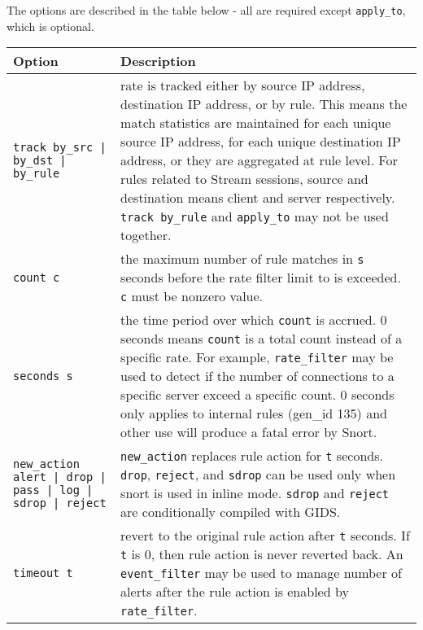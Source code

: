 \documentclass[english]{report}
\begin{document}
The options are described in the table below - all are required except
\texttt{apply\_to}, which is optional.

\begin{table}[h]
\begin{center}
\begin{tabular}{| p{2in} | p{4in} |}

\hline
\textbf{Option} & \textbf{Description}\\
\hline

\hline
\texttt{track by\_src | by\_dst | by\_rule} &

rate is tracked either by source IP address, destination IP address, or by
rule.  This means the match statistics are maintained for each unique source IP
address, for each unique destination IP address, or they are aggregated at rule
level.  For rules related to Stream sessions, source and destination means
client and server respectively.  \texttt{track by\_rule} and \texttt{apply\_to}
may not be used together.\\

\hline
\texttt{count c} &

the maximum number of rule matches in \texttt{s} seconds before the rate filter
limit to is exceeded.  \texttt{c} must be nonzero value.\\

\hline
\texttt{seconds s} &

the time period over which \texttt{count} is accrued. 0 seconds means
\texttt{count} is a total count instead of a specific rate.  For example,
\texttt{rate\_filter} may be used to detect if the number of connections to a
specific server exceed a specific count.  0 seconds only applies to internal
rules (gen\_id 135) and other use will produce a fatal error by Snort.\\

\hline
\texttt{new\_action alert | drop | pass | log | sdrop | reject} &

\texttt{new\_action} replaces rule action for \texttt{t} seconds.
\texttt{drop}, \texttt{reject}, and \texttt{sdrop} can be used only when snort
is used in inline mode.  \texttt{sdrop} and \texttt{reject} are conditionally
compiled with GIDS.\\

\hline
\texttt{timeout t} &

revert to the original rule action after \texttt{t} seconds.  If \texttt{t} is
0, then rule action is never reverted back.  An \texttt{event\_filter} may be
used to manage number of alerts after the rule action is enabled by
\texttt{rate\_filter}.\\


\end{tabular}
\end{center}
\end{table}
\end{document}
